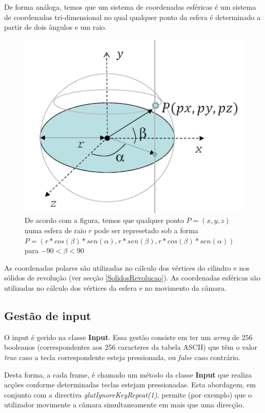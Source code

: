 \documentclass[a5paper,onecolumn, 11pt]{article}
\begin{document}
\clearpage
De forma análoga, temos que um sistema de coordenadas esféricas é um sistema de coordenadas tri-dimensional no qual qualquer ponto da esfera é determinado a partir de dois ângulos e um raio.
\begin{figure}[!htb]
    \centering
    \includegraphics[scale=0.5]{coordEsfericas.png}
    \caption[Coordenadas Esféricas]{De acordo com a figura, temos que qualquer ponto \hbox{$P = (x,y,z)$} numa esfera de raio $r$ pode ser represetado sob a forma \hbox{$P = (r*cos(\beta)*sen(\alpha), r*sen(\beta), r*cos(\beta)*sen(\alpha))$} para \hbox{$-90 < \beta < 90$}}
\end{figure}

As coordenadas polares são utilizadas no cálculo dos vértices do cilindro e nos sólidos de revolução (ver secção \ref{SolidosRevolucao}). As coordenadas esféricas são utilizadas no cálculo dos vértices da esfera e no movimento da câmara.

\clearpage
\newpage
\subsection{Gestão de input} \label{Gestao de input}
O input é gerido na classe \textbf{Input}. Essa gestão consiste em ter um \textit{array} de $256$ booleanos (correspondentes aos 256 caracteres da tabela ASCII) que têm o valor \textit{true} caso a tecla correspondente esteja pressionada, ou \textit{false} caso contrário.

Desta forma, a cada frame, é chamado um método da classe \textbf{Input} que realiza acções conforme determinadas teclas estejam pressionadas. Esta abordagem, em conjunto com a directiva \textit{glutIgnoreKeyRepeat(1)}, permite (por exemplo) que o utilizador movimente a câmara simultaneamente em mais que uma direcção.
\end{document}
